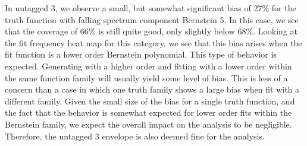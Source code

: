 In untagged 3, we observe a small, but somewhat significant bias of 27\% for the truth function with falling spectrum
component Bernstein 5. In this case, we see that the coverage of 66\% is still quite good, only slightly below 68\%. 
Looking at the fit frequency heat map for this category, we see that this bias arises when the fit function is a 
lower order Bernstein polynomial. This type of behavior is expected. Generating with a higher order and fitting with a lower 
order within the same function family will usually yield some level of bias. This is less of a concern than a case in which one 
truth family shows a large bias when fit with a different family. Given the small size of the bias for a single truth 
function, and the fact that the behavior is somewhat expected for lower order fits within the Bernstein family, we expect 
the overall impact on the analysis to be negligible. Therefore, the untagged 3 envelope is also deemed fine for the analysis. 

